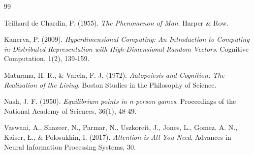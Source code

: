 \documentclass[12pt,openany]{book}
\begin{document}
\begin{thebibliography}{99}

Teilhard de Chardin, P. (1955). \textit{The Phenomenon of Man}. Harper \& Row.

Kanerva, P. (2009). \textit{Hyperdimensional Computing: An Introduction to Computing in Distributed Representation with High-Dimensional Random Vectors}. Cognitive Computation, 1(2), 139-159.

Maturana, H. R., \& Varela, F. J. (1972). \textit{Autopoiesis and Cognition: The Realization of the Living}. Boston Studies in the Philosophy of Science.

Nash, J. F. (1950). \textit{Equilibrium points in n-person games}. Proceedings of the National Academy of Sciences, 36(1), 48-49.

Vaswani, A., Shazeer, N., Parmar, N., Uszkoreit, J., Jones, L., Gomez, A. N., Kaiser, \L., \& Polosukhin, I. (2017). \textit{Attention is All You Need}. Advances in Neural Information Processing Systems, 30.

\end{thebibliography}
\end{document}
